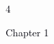 \documentclass[12pt]{article}
\begin{document}
\vspace{\baselineskip}

\vspace{\baselineskip}

\vspace{\baselineskip}

\vspace{\baselineskip}

\vspace{\baselineskip}

\vspace{\baselineskip}

\vspace{\baselineskip}

\vspace{\baselineskip}

\vspace{\baselineskip}

\vspace{\baselineskip}

\vspace{\baselineskip}

\vspace{\baselineskip}

\vspace{\baselineskip}

\vspace{\baselineskip}

\vspace{\baselineskip}

\vspace{\baselineskip}

\vspace{\baselineskip}

\vspace{\baselineskip}

\vspace{\baselineskip}

\vspace{\baselineskip}

\vspace{\baselineskip}
\begin{adjustwidth}{0.0in}{-0.3in}
\begin{Center}
\textcolor[HTML]{00000A}{4}
\end{Center}\par

\end{adjustwidth}


\vspace{\baselineskip}
{\fontsize{14pt}{16.8pt}\selectfont \textcolor[HTML]{00000A}{Chapter 1}\par}\par
\end{document}
